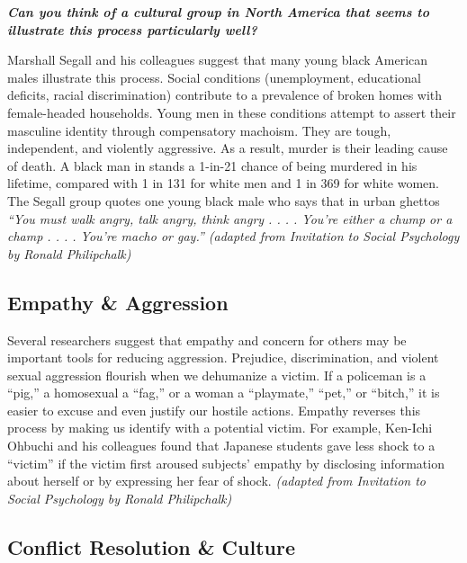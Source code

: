 \documentclass[
]{book}
\begin{document}
\textbf{\emph{Can you think of a cultural group in North America that seems to illustrate this process particularly well?}}

Marshall Segall and his colleagues suggest that many young black American males illustrate this process. Social conditions (unemployment, educational deficits, racial discrimination) contribute to a prevalence of broken homes with female-headed households. Young men in these conditions attempt to assert their masculine identity through compensatory machoism. They are tough, independent, and violently aggressive. As a result, murder is their leading cause of death. A black man in stands a 1-in-21 chance of being murdered in his lifetime, compared with 1 in 131 for white men and 1 in 369 for white women. The Segall group quotes one young black male who says that in urban ghettos \emph{``You must walk angry, talk angry, think angry . . . . You're either a chump or a champ . . . . You're macho or gay.'' (adapted from Invitation to Social Psychology by Ronald Philipchalk)}

\hypertarget{empathy-aggression}{%
\subsection*{Empathy \& Aggression}\label{empathy-aggression}}

Several researchers suggest that empathy and concern for others may be important tools for reducing aggression. Prejudice, discrimination, and violent sexual aggression flourish when we dehumanize a victim. If a policeman is a ``pig,'' a homosexual a ``fag,'' or a woman a ``playmate,'' ``pet,'' or ``bitch,'' it is easier to excuse and even justify our hostile actions. Empathy reverses this process by making us identify with a potential victim. For example, Ken-Ichi Ohbuchi and his colleagues found that Japanese students gave less shock to a ``victim'' if the victim first aroused subjects' empathy by disclosing information about herself or by expressing her fear of shock. \emph{(adapted from Invitation to Social Psychology by Ronald Philipchalk)}

\hypertarget{conflict-resolution-culture}{%
\subsection*{Conflict Resolution \& Culture}\label{conflict-resolution-culture}}
\end{document}
